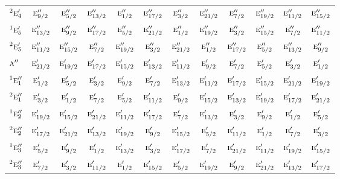 \documentclass[10pt,a4paper]{article}
\numberwithin{equation}{section}
\newcommand{\irr}[1]{\text{\normalfont\scshape #1}}
\newcommand{\conjpair}[1]{{}^{#1}}
\begin{document}
{\begin{longtable}{@{}lccccccccccc@{}}
$\conjpair{2}\irr{e}_{4}'$ & $\irr{e}_{9/2}''$ & $\irr{e}_{5/2}''$ & $\irr{e}_{13/2}''$ & $\irr{e}_{1/2}''$ & $\irr{e}_{17/2}''$ & $\irr{e}_{3/2}''$ & $\irr{e}_{21/2}''$ & $\irr{e}_{7/2}''$ & $\irr{e}_{19/2}''$ & $\irr{e}_{11/2}''$ & $\irr{e}_{15/2}''$\\
$\conjpair{1}\irr{e}_{5}'$ & $\irr{e}_{13/2}''$ & $\irr{e}_{9/2}''$ & $\irr{e}_{17/2}''$ & $\irr{e}_{5/2}''$ & $\irr{e}_{21/2}''$ & $\irr{e}_{1/2}''$ & $\irr{e}_{19/2}''$ & $\irr{e}_{3/2}''$ & $\irr{e}_{15/2}''$ & $\irr{e}_{7/2}''$ & $\irr{e}_{11/2}''$\\
$\conjpair{2}\irr{e}_{5}'$ & $\irr{e}_{11/2}''$ & $\irr{e}_{15/2}''$ & $\irr{e}_{7/2}''$ & $\irr{e}_{19/2}''$ & $\irr{e}_{3/2}''$ & $\irr{e}_{21/2}''$ & $\irr{e}_{1/2}''$ & $\irr{e}_{17/2}''$ & $\irr{e}_{5/2}''$ & $\irr{e}_{13/2}''$ & $\irr{e}_{9/2}''$\\
$\irr{a}''$ & $\irr{e}_{21/2}'$ & $\irr{e}_{19/2}'$ & $\irr{e}_{17/2}'$ & $\irr{e}_{15/2}'$ & $\irr{e}_{13/2}'$ & $\irr{e}_{11/2}'$ & $\irr{e}_{9/2}'$ & $\irr{e}_{7/2}'$ & $\irr{e}_{5/2}'$ & $\irr{e}_{3/2}'$ & $\irr{e}_{1/2}'$\\
$\conjpair{1}\irr{e}_{1}''$ & $\irr{e}_{1/2}'$ & $\irr{e}_{5/2}'$ & $\irr{e}_{3/2}'$ & $\irr{e}_{9/2}'$ & $\irr{e}_{7/2}'$ & $\irr{e}_{13/2}'$ & $\irr{e}_{11/2}'$ & $\irr{e}_{17/2}'$ & $\irr{e}_{15/2}'$ & $\irr{e}_{21/2}'$ & $\irr{e}_{19/2}'$\\
$\conjpair{2}\irr{e}_{1}''$ & $\irr{e}_{3/2}'$ & $\irr{e}_{1/2}'$ & $\irr{e}_{7/2}'$ & $\irr{e}_{5/2}'$ & $\irr{e}_{11/2}'$ & $\irr{e}_{9/2}'$ & $\irr{e}_{15/2}'$ & $\irr{e}_{13/2}'$ & $\irr{e}_{19/2}'$ & $\irr{e}_{17/2}'$ & $\irr{e}_{21/2}'$\\
$\conjpair{1}\irr{e}_{2}''$ & $\irr{e}_{19/2}'$ & $\irr{e}_{15/2}'$ & $\irr{e}_{21/2}'$ & $\irr{e}_{11/2}'$ & $\irr{e}_{17/2}'$ & $\irr{e}_{7/2}'$ & $\irr{e}_{13/2}'$ & $\irr{e}_{3/2}'$ & $\irr{e}_{9/2}'$ & $\irr{e}_{1/2}'$ & $\irr{e}_{5/2}'$\\
$\conjpair{2}\irr{e}_{2}''$ & $\irr{e}_{17/2}'$ & $\irr{e}_{21/2}'$ & $\irr{e}_{13/2}'$ & $\irr{e}_{19/2}'$ & $\irr{e}_{9/2}'$ & $\irr{e}_{15/2}'$ & $\irr{e}_{5/2}'$ & $\irr{e}_{11/2}'$ & $\irr{e}_{1/2}'$ & $\irr{e}_{7/2}'$ & $\irr{e}_{3/2}'$\\
$\conjpair{1}\irr{e}_{3}''$ & $\irr{e}_{5/2}'$ & $\irr{e}_{9/2}'$ & $\irr{e}_{1/2}'$ & $\irr{e}_{13/2}'$ & $\irr{e}_{3/2}'$ & $\irr{e}_{17/2}'$ & $\irr{e}_{7/2}'$ & $\irr{e}_{21/2}'$ & $\irr{e}_{11/2}'$ & $\irr{e}_{19/2}'$ & $\irr{e}_{15/2}'$\\
$\conjpair{2}\irr{e}_{3}''$ & $\irr{e}_{7/2}'$ & $\irr{e}_{3/2}'$ & $\irr{e}_{11/2}'$ & $\irr{e}_{1/2}'$ & $\irr{e}_{15/2}'$ & $\irr{e}_{5/2}'$ & $\irr{e}_{19/2}'$ & $\irr{e}_{9/2}'$ & $\irr{e}_{21/2}'$ & $\irr{e}_{13/2}'$ & $\irr{e}_{17/2}'$\\

\end{longtable}}
\end{document}
